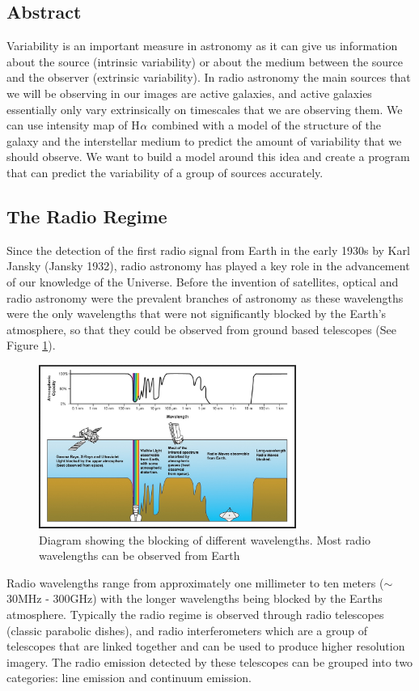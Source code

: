 \documentclass[a4paper, 10pt]{article}
\begin{document}
\subsection{Abstract}
Variability is an important measure in astronomy as it can give us information about the source (intrinsic variability) or about the medium between the source and the observer (extrinsic variability). In radio astronomy the main sources that we will be observing in our images are active galaxies, and active galaxies essentially only vary extrinsically on timescales that we are observing them. We can use intensity map of H$\ce{\alpha}$ combined with a model of the structure of the galaxy and the interstellar medium to predict the amount of variability that we should observe. We want to build a model around this idea and create a program that can predict the variability of a group of sources accurately.
\subsection{The Radio Regime} \label{radio}
Since the detection of the first radio signal from Earth in the early 1930s by Karl Jansky (Jansky 1932), radio astronomy has played a key role in the advancement of our knowledge of the Universe. Before the invention of satellites, optical and radio astronomy were the prevalent branches of astronomy as these wavelengths were the only wavelengths that were not significantly blocked by the Earth's atmosphere, so that they could be observed from ground based telescopes (See Figure \ref{abs}).

\begin{figure}[H]
\begin{center}
	\includegraphics[width=0.75\textwidth]{atmo-abs}
	\caption{Diagram showing the blocking of different wavelengths. Most radio wavelengths can be observed from Earth\footnotemark}
	\label{abs}
\end{center}
\end{figure}
Radio wavelengths range from approximately one millimeter to ten meters ($\sim$ 30MHz - 300GHz) with the longer wavelengths being blocked by the Earths atmosphere. Typically the radio regime is observed through radio telescopes (classic parabolic dishes), and radio interferometers which are a group of telescopes that are linked together and can be used to produce higher resolution imagery. The radio emission detected by these telescopes can be grouped into two categories: line emission and continuum emission.
\end{document}
